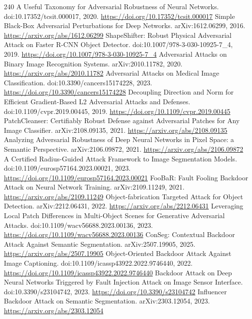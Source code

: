 \documentclass[11pt]{article}
\begin{document}
\begin{thebibliography}{240}
 A Useful Taxonomy for Adversarial Robustness of Neural Networks. doi:10.17352/tcsit.000017, 2020. \url{https://doi.org/10.17352/tcsit.000017}
 Simple Black-Box Adversarial Perturbations for Deep Networks. arXiv:1612.06299, 2016. \url{https://arxiv.org/abs/1612.06299}
 ShapeShifter: Robust Physical Adversarial Attack on Faster R-CNN Object Detector. doi:10.1007/978-3-030-10925-7\_4, 2019. \url{https://doi.org/10.1007/978-3-030-10925-7_4}
 Adversarial Attacks on Binary Image Recognition Systems. arXiv:2010.11782, 2020. \url{https://arxiv.org/abs/2010.11782}
 Adversarial Attacks on Medical Image Classification. doi:10.3390/cancers15174228, 2023. \url{https://doi.org/10.3390/cancers15174228}
 Decoupling Direction and Norm for Efficient Gradient-Based L2 Adversarial Attacks and Defenses. doi:10.1109/cvpr.2019.00445, 2019. \url{https://doi.org/10.1109/cvpr.2019.00445}
 PatchCleanser: Certifiably Robust Defense against Adversarial Patches for Any Image Classifier. arXiv:2108.09135, 2021. \url{https://arxiv.org/abs/2108.09135}
 Analyzing Adversarial Robustness of Deep Neural Networks in Pixel Space: a Semantic Perspective. arXiv:2106.09872, 2021. \url{https://arxiv.org/abs/2106.09872}
 A Certified Radius-Guided Attack Framework to Image Segmentation Models. doi:10.1109/eurosp57164.2023.00021, 2023. \url{https://doi.org/10.1109/eurosp57164.2023.00021}
 FooBaR: Fault Fooling Backdoor Attack on Neural Network Training. arXiv:2109.11249, 2021. \url{https://arxiv.org/abs/2109.11249}
 Object-fabrication Targeted Attack for Object Detection. arXiv:2212.06431, 2022. \url{https://arxiv.org/abs/2212.06431}
 Leveraging Local Patch Differences in Multi-Object Scenes for Generative Adversarial Attacks. doi:10.1109/wacv56688.2023.00136, 2023. \url{https://doi.org/10.1109/wacv56688.2023.00136}
 ConSeg: Contextual Backdoor Attack Against Semantic Segmentation. arXiv:2507.19905, 2025. \url{https://arxiv.org/abs/2507.19905}
 Object-Oriented Backdoor Attack Against Image Captioning. doi:10.1109/icassp43922.2022.9746440, 2022. \url{https://doi.org/10.1109/icassp43922.2022.9746440}
 Backdoor Attack on Deep Neural Networks Triggered by Fault Injection Attack on Image Sensor Interface. doi:10.3390/s23104742, 2023. \url{https://doi.org/10.3390/s23104742}
 Influencer Backdoor Attack on Semantic Segmentation. arXiv:2303.12054, 2023. \url{https://arxiv.org/abs/2303.12054}

\end{thebibliography}
\end{document}
